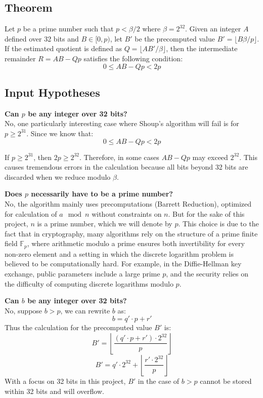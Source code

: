 \documentclass{article}
\begin{document}
\subsection{Theorem}
Let $p$ be a prime number such that $p < \beta/2$ where $\beta = 2^{32}$. Given an integer $A$ defined over 32 bits and
$B \in [0, p)$, let $B'$ be the precomputed value $B' = \lfloor B\beta/p \rfloor$.
If the estimated quotient is defined as $Q = \lfloor AB'/\beta \rfloor$, then the intermediate remainder $R = AB - Qp$ satisfies the following condition:
$$0 \le AB - Qp < 2p$$


\subsection{Input Hypotheses}
\textbf{Can $p$ be any integer over 32 bits?} \\
No, one particularly interesting case where Shoup's algorithm will fail is for $p \ge 2^{31}$.
Since we know that:
$$0 \le AB - Qp < 2p$$

If $p \ge 2^{31}$, then $2p \ge 2^{32}$. Therefore, in some cases $AB - Qp$ may exceed $2^{32}$. This causes tremendous errors in the calculation because
all bits beyond 32 bits are discarded when we reduce modulo $\beta$.

\textbf{Does $p$ necessarily have to be a prime number?} \\
No, the algorithm mainly uses precomputations (Barrett Reduction), optimized for calculation of $a \mod n$ without constraints on $n$. But for the sake of this project, $n$ is a prime number, which we will denote by $p$. This choice is due to the fact that in cryptography, many algorithms rely on the structure of a prime finite field $\mathbb{F}_p$, where arithmetic modulo a prime ensures both invertibility for every non-zero element and a setting in which the discrete logarithm problem is believed to be computationally hard. For example, in the Diffie-Hellman key exchange, public parameters include a large prime $p$, and the security relies on the difficulty of computing discrete logarithms modulo $p$.

\textbf{Can $b$ be any integer over 32 bits?} \\
No, suppose $ b > p $, we can rewrite $b$ as:
\[b = q'\cdot p + r'\]
Thus the calculation for the precomputed value $B'$ is:
\[B' = \left\lfloor\frac{(q' \cdot p + r')\cdot 2^{32}}{p}\right\rfloor\]
\[B' = q' \cdot 2^{32} + \left\lfloor\frac{r'\cdot 2^{32}}{p}\right\rfloor\]
With a focus on 32 bits in this project, $B'$ in the case of $b>p$ cannot be stored within 32 bits and will overflow.
\end{document}
